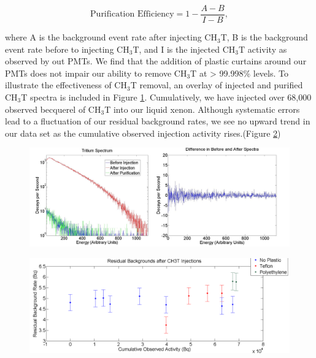\documentclass[a4paper,12pt]{article}
\begin{document}
{\begin{equation}
\text{Purification Efficiency} = 1 - \frac{A-B}{I-B},
\end{equation}

where A is the background event rate after injecting CH$_3$T, B is the background event rate before to injecting CH$_3$T, and I is the injected CH$_3$T activity as observed by out PMTs. We find that the addition of plastic curtains around our PMTs does not impair our ability to remove CH$_3$T at > 99.998\% levels. To illustrate the effectiveness of CH$_3$T removal, an overlay of injected and purified CH$_3$T spectra is included in Figure \ref{BeforeAndAfterSpec}. Cumulatively, we have injected over 68,000 observed becquerel of CH$_3$T into our liquid xenon. Although systematic errors lead to a fluctuation of our residual background rates, we see no upward trend in our data set as the cumulative observed injection activity rises.(Figure \ref{UMDBackgroundOverTime})


\begin{figure}
\includegraphics[scale=.5]{UMDspectra.png} 
\label{BeforeAndAfterSpec}
\end{figure}

\begin{figure}
\includegraphics[scale=.35]{ResidualBackgroundCorrected_SystemErr.png} 
\label{UMDBackgroundOverTime}
\end{figure}

}
\end{document}
